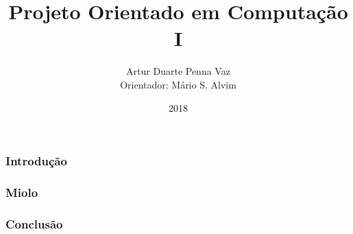 \documentclass{beamer}
\title{Projeto Orientado em Computação I}
\author{Artur Duarte Penna Vaz \\ Orientador: Mário S. Alvim}
\institute{Universidade Federal de Minas Gerais}
\date{2018}
\begin{document}
 
\frame{\titlepage}
 
\begin{frame}
\frametitle{Introdução}
\end{frame}
 
\begin{frame}
\frametitle{Miolo}
\end{frame}

\begin{frame}
\frametitle{Conclusão}
\end{frame}
\end{document}
